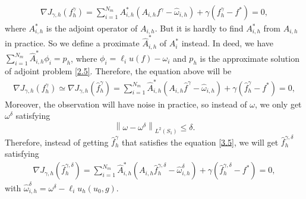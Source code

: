 \documentclass[]{article}
\begin{document}
\begin{align}\label{3.3}
	\nabla J_{\gamma, h}(f^\gamma_h)= \sum_{i=1}^{N_m}A_{i, h}^*(A_{i, h}f^\gamma-\hat{\omega}_{i, h})+\gamma(f^\gamma_h-f^*)=0,
\end{align}
where $A_{i, h}^*$ is the adjoint operator of $A_{i, h}$. But it is hardly to find $A^*_{i, h}$ from $A_{i, h}$ in practice. So we define a proximate $\hat{A}_{i, h}^*$ of $A_i^*$ instead. In deed, we have $\sum_{i=1}^{N_m}\hat{A}^*_{i, h}\phi_i=p_h$, where $\phi_i=\ell_i u(f) - \omega_i$ and $p_h$ is the approximate solution of adjoint problem \eqref{2.5}. Therefore, the equation above will be
\begin{align}\label{3.4}
	\nabla J_{\gamma, h}(f^\gamma_h)\simeq\nabla J_{\gamma, h}(\hat{f}^\gamma_h)= \sum_{i=1}^{N_m}\hat{A}_{i, h}^*(A_{i, h}\hat{f}^\gamma-\hat{\omega}_{i, h})+\gamma(\hat{f}^\gamma_h-f^*)=0,
\end{align}
Moreover, the observation will have noise in practice, so instead of $\omega$, we only get $\omega^{\delta}$ satisfying
$$\left\| \omega-\omega^\delta\right\|_{L^2(S_1)}\leq \delta.$$
Therefore, instead of getting $\hat{f}^\gamma_h$ that satisfies the equation \eqref{3.5}, we will get $\hat{f}^{\gamma, \delta}_h$ satisfying
\begin{align}\label{3.5}
	\nabla J_{\gamma, h}\left(\hat{f}^{\gamma, \delta}_h\right)= \sum_{i=1}^{N_m}\hat{A}_{i, h}^*(A_{i, h}\hat{f}^{\gamma, \delta}_h-\hat{\omega}_{i, h}^\delta)+\gamma(\hat{f}^{\gamma, \delta}_h-f^*)=0,
\end{align}
with $\hat{\omega}_{i, h}^\delta=\omega^\delta-\ell_i u_h(u_0, g)$.
\end{document}
